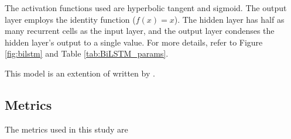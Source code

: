 The activation functions used are hyperbolic tangent and sigmoid. The output layer employs the identity function ($f(x) = x$). The hidden layer has half as many recurrent cells as the input layer, and the output layer condenses the hidden layer's output to a single value. For more details, refer to Figure \ref{fig:bilstm} and Table \ref{tab:BiLSTM_params}.


This model is an extention of \cite{li_modeling_2020} written by \citeauthor{li_modeling_2020}. 

\subsection{Metrics}

The metrics used in this study are

